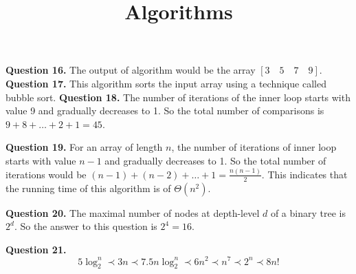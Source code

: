\documentclass{ximera}
\title{Algorithms}
\begin{document}
\maketitle

\textbf{Question 16.} The output of algorithm would be the array $ [3 \quad 5 \quad 7 \quad 9] $.
\textbf{Question 17.} This algorithm sorts the input array using a technique called bubble sort.
\textbf{Question 18.}  The number of iterations of the inner loop starts with value 9 and gradually decreases to 1. So the total number of comparisons is $ 9 + 8 + \ldots + 2 + 1 = 45$.

\textbf{Question 19.} For an array of length $n$, the number of iterations of inner loop starts with value $n-1$ and gradually decreases to 1. So the total number of iterations would be $(n-1) + (n-2) + \ldots + 1 = \frac{n(n-1)}{2}$. This indicates that the running time of this algorithm is of $\Theta(n^2)$.

\textbf{Question 20.} The maximal number of nodes at depth-level $d$ of a binary tree is $2^d$. So the answer to this question is $2^4 = 16$. 

\textbf{Question 21.}
\begin{equation*}
5 \log_2^n \prec 3n \prec 7.5 n \log_2^n \prec 6n^2 \prec n^7 \prec 2^n \prec 8n!
\end{equation*}
\end{document}
